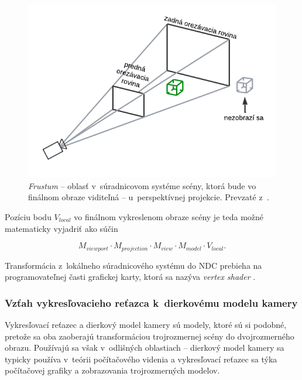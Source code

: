 \begin{figure}[h!]
    \centering
    \includegraphics[width=0.6\linewidth]{text_prace/obrazky-figures/perspektivna_projekcia_frustum.pdf}
    \caption[Frustum u~perspektívnej projekcie.]{\emph{Frustum} -- oblasť v~súradnicovom systéme scény, ktorá bude vo finálnom obraze viditeľná -- u~perspektívnej projekcie. Prevzaté z~\cite{de_vries_coordinate_systems}.}
    \label{fig:perspektivna_projekcia_frustum}
\end{figure}

Pozíciu bodu $V_{local}$ vo finálnom vykreslenom obraze scény je teda možné matematicky vyjadriť ako súčin

$$ M_{viewport} \cdot M_{projection} \cdot M_{view} \cdot M_{model} \cdot V_{local} \mathrm{.}$$

Transformácia z~lokálneho súradnicového systému do NDC prebieha na programovateľnej časti grafickej karty, ktorá sa nazýva \emph{vertex shader} \cite{de_vries_coordinate_systems}.

\subsubsection{Vzťah vykresľovacieho reťazca k~dierkovému modelu kamery}

Vykresľovací reťazec a dierkový model kamery sú modely, ktoré sú si podobné, pretože sa oba zaoberajú transformáciou trojrozmernej scény do dvojrozmerného obrazu. Používajú sa však v~odlišných oblastiach -- dierkový model kamery sa typicky používa v~teórii počítačového videnia a vykresľovací reťazec sa týka počítačovej grafiky a zobrazovania trojrozmerných modelov.

